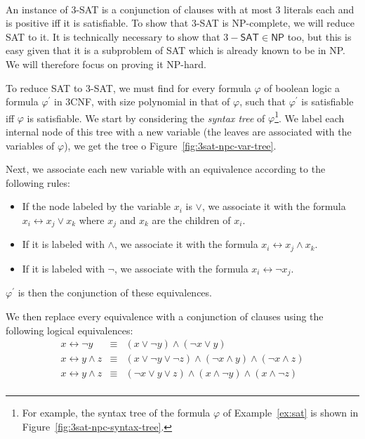 \begin{example}\ \\
    \label{ex:3sat-npc}
    An instance of 3-\textsf{SAT} is a conjunction of clauses with at most 3 literals each and is positive iff it is satisfiable. To show that 3-\textsf{SAT} is \textsf{NP}-complete, we will reduce \textsf{SAT} to it. It is technically necessary to show that \(3-\textsf{SAT}\in\textsf{NP}\) too, but this is easy given that it is a subproblem of \textsf{SAT} which is already known to be in \textsf{NP}. We will therefore focus on proving it \textsf{NP}-hard.

    To reduce \textsf{SAT} to 3-\textsf{SAT}, we must find for every formula \(\varphi\) of boolean logic a formula \(\varphi^\prime\) in 3CNF, with size polynomial in that of \(\varphi\), such that \(\varphi^\prime\) is satisfiable iff \(\varphi\) is satisfiable. We start by considering the \emph{syntax tree} of \(\varphi\)\footnote{For example, the syntax tree of the formula \(\varphi\) of Example~\ref{ex:sat} is shown in Figure~\ref{fig:3sat-npc-syntax-tree}.}. We label each internal node of this tree with a new variable (the leaves are associated with the variables of \(\varphi\)), we get the tree o Figure~\ref{fig:3sat-npc-var-tree}.

    Next, we associate each new variable with an equivalence according to the following rules:
    \begin{itemize}
        \item If the node labeled by the variable \(x_i\) is \(\vee\), we associate it with the formula \(x_i \leftrightarrow x_j \vee x_k\) where \(x_j\) and \(x_k\) are the children of \(x_i\).
        \item If it is labeled with \(\wedge\), we associate it with the formula \(x_i \leftrightarrow x_j \wedge x_k\).
        \item If it is labeled with \(\neg\), we associate with the formula \(x_i \leftrightarrow \neg x_j\).
    \end{itemize}

    \(\varphi^\prime\) is then the conjunction of these equivalences.

    We then replace every equivalence with a conjunction of clauses using the following logical equivalences:
    \[
        \begin{array}{ccl}
            x \leftrightarrow \neg y &\equiv& (x\vee\neg y)\wedge (\neg x \vee y) \\
            x \leftrightarrow y \wedge z &\equiv& (x\vee\neg y\vee\neg z) \wedge 
            (\neg x \wedge y) \wedge (\neg x \wedge z) \\
            x \leftrightarrow y \wedge z &\equiv& (\neg x\vee y\vee z) \wedge 
            (x \wedge\neg y) \wedge (x \wedge\neg z) \\
        \end{array}
    \]


\end{example}
